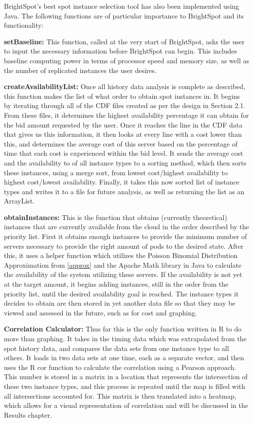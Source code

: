 \documentclass[thesis,proposal]{umassthesis}  %
\begin{document}
BrightSpot's best spot instance selection tool has also been implemented using Java. The following functions are of particular importance to BrightSpot and its functionality:

{\bf setBaseline:} This function, called at the very start of BrightSpot, asks the user to input the necessary information before BrightSpot can begin. This includes baseline computing power in terms of processor speed and memory size, as well as the number of replicated instances the user desires.

{\bf createAvailabilityList:} Once all history data analysis is complete as described, this function makes the list of what order to obtain spot instances in. It begins by iterating through all of the CDF files created as per the design in Section 2.1. From these files, it determines the highest availability percentage it can obtain for the bid amount requested by the user. Once it reaches the line in the CDF data that gives us this information, it then looks at every line with a cost lower than this, and determines the average cost of this server based on the percentage of time that each cost is experienced within the bid level. It sends the average cost and the availability to of all instance types to a sorting method, which then sorts these instances, using a merge sort, from lowest cost/highest availability to highest cost/lowest availability. Finally, it takes this now sorted list of instance types and writes it to a file for future analysis, as well as returning the list as an ArrayList.

{\bf obtainInstances:} This is the function that obtains (currently theoretical) instances that are currently available from the cloud in the order described by the priority list. First it obtains enough instances to provide the minimum number of servers necessary to provide the right amount of pods to the desired state. After this, it uses a helper function which utilizes the Poisson Binomial Distribution Approximation from \eqref{approx} and the Apache Math library in Java to calculate the availability of the system utilizing these servers. If the availability is not yet at the target amount, it begins adding instances, still in the order from the priority list, until the desired availability goal is reached. The instance types it decides to obtain are then stored in yet another data file so that they may be viewed and assessed in the future, such as for cost and graphing.

{\bf Correlation Calculator:} Thus far this is the only function written in R to do more than graphing. It takes in the timing data which was extrapolated from the spot history data, and compares the data sets from one instance type to all others. It loads in two data sets at one time, each as a separate vector, and then uses the R cor function to calculate the correlation using a Pearson approach. This number is stored in a matrix in a location that represents the intersection of these two instance types, and this process is repeated until the map is filled with all intersections accounted for. This matrix is then translated into a heatmap, which allows for a visual representation of correlation and will be discussed in the Results chapter.
\end{document}
